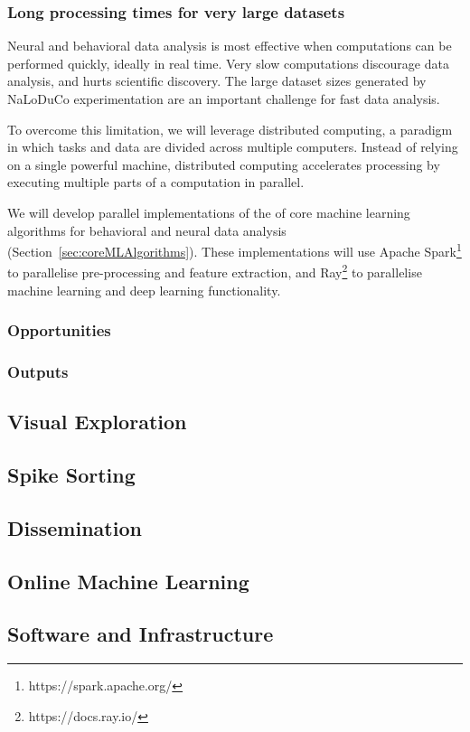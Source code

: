 \documentclass[12pt]{article}
\begin{document}
\subsubsection*{Long processing times for very large datasets}

Neural and behavioral data analysis is most effective when computations can be
performed quickly, ideally in real time. Very slow computations discourage data
analysis, and hurts scientific discovery. The large dataset sizes generated by
NaLoDuCo experimentation are an important challenge for fast data analysis.

To overcome this limitation, we will leverage distributed computing, a paradigm
in which tasks and data are divided across multiple computers. Instead of
relying on a single powerful machine, distributed computing accelerates
processing by executing multiple parts of a computation in parallel.

We will develop parallel implementations of the of core machine learning
algorithms for behavioral and neural data analysis (Section~\ref{sec:coreMLAlgorithms}).
These implementations will use Apache Spark\footnote{https://spark.apache.org/}
to parallelise pre-processing and feature extraction, and
Ray\footnote{https://docs.ray.io/} to parallelise machine learning and deep
learning functionality.

\subsubsection{Opportunities}

\subsubsection{Outputs}

\subsection{Visual Exploration}

\subsection{Spike Sorting}

\subsection{Dissemination}

\subsection{Online Machine Learning}

\subsection{Software and Infrastructure}
\end{document}
